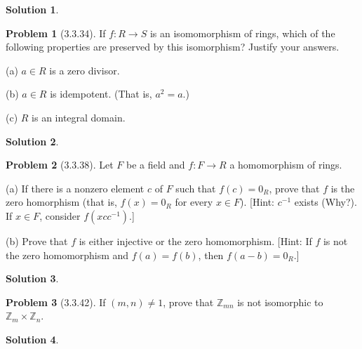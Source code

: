 \documentclass[12pt]{article}
\theoremstyle{definition}
\newtheorem*{prob}{Problem}
\newtheorem*{soln}{Solution}
\newcommand{\ZZ}{{\mathbb{Z}}}
\begin{document}
\begin{soln}

\end{soln}

\begin{prob}[3.3.34]
If  $f:R \to S$ is an isomomorphism of  rings, which of  the following properties are 
preserved by this isomorphism? Justify your answers.     

(a) $a\in R$ is a zero divisor.

(b) $a\in R$ is idempotent. (That is, $a^2=a$.)

(c) $R$ is an integral domain.
\end{prob}

\begin{soln}

\end{soln}

\begin{prob}[3.3.38]
Let $F$ be a field and $f:F \to R$ a homomorphism of  rings.     

(a)   If there is a nonzero element $c$ of  $F$ such that $f(c) = 0_R$, 
prove that $f$ is the zero homorphism (that is, $f(x) = 0_R$ for every $x\in F$). 
[Hint: $c^{-1}$ exists (Why?). If  $x\in F$, consider $f(xcc^{-1})$.]     

(b)   Prove that $f$ is either injective or the zero homomorphism. 
[Hint: If  $f$ is not the zero homomorphism and $f(a) = f(b)$, then $f(a - b) = 0_R$.]
\end{prob}

\begin{soln}

\end{soln}


\begin{prob}[3.3.42]
If  $(m, n) \neq 1$, prove that $\ZZ_{mn}$ is not isomorphic to $\ZZ_m \times \ZZ_n$.
\end{prob}

\begin{soln}

\end{soln}
\end{document}
